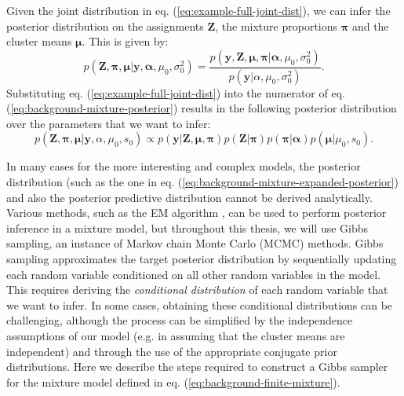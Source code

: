 Given the joint distribution in eq. (\ref{eq:example-full-joint-dist}), we can infer the posterior distribution on the assignments $\boldsymbol{Z}$, the mixture proportions $\boldsymbol{\pi}$ and the cluster means $\boldsymbol{\mu}$. This is given by:
\begin{equation}
p(\boldsymbol{Z},\boldsymbol{\pi},\boldsymbol{\mu} \vert \boldsymbol{y}, \boldsymbol{\alpha},\mu_0,\sigma_0^2) = \frac{p(\boldsymbol{y}, \boldsymbol{Z}, \boldsymbol{\mu},\boldsymbol{\pi} \vert \boldsymbol{\alpha},\mu_0,\sigma_0^2)}{p(\boldsymbol{y} \vert \alpha,\mu_0,\sigma_0^2)}.
\label{eq:background-mixture-posterior}
\end{equation}
Substituting eq. (\ref{eq:example-full-joint-dist}) into the numerator of eq. (\ref{eq:background-mixture-posterior}) results in the following posterior distribution over the parameters that we want to infer:
\begin{equation}
p(\boldsymbol{Z},\boldsymbol{\pi},\boldsymbol{\mu} \vert \boldsymbol{y},\alpha,\mu_0,s_0) \propto p(\boldsymbol{y} \vert \boldsymbol{Z}, \boldsymbol{\mu},\boldsymbol{\pi}) p(\boldsymbol{Z} \vert \boldsymbol{\pi}) p(\boldsymbol{\pi} \vert \boldsymbol{\alpha}) p(\boldsymbol{\mu} \vert \mu_0, s_0).
\label{eq:background-mixture-expanded-posterior}
\end{equation}

In many cases for the more interesting and complex models, the posterior distribution (such as the one in eq. (\ref{eq:background-mixture-expanded-posterior}) and also the posterior predictive distribution cannot be derived analytically. Various methods, such as the EM algorithm \cite{gelman2014bayesian}, can be used to perform posterior inference in a mixture model, but throughout this thesis, we will use Gibbs sampling, an instance of Markov chain Monte Carlo (MCMC) methods. Gibbs sampling approximates the target posterior distribution by sequentially updating each random variable conditioned on all other random variables in the model. This requires deriving the \emph{conditional distribution} of each random variable that we want to infer. In some cases, obtaining these conditional distributions can be challenging, although the process can be simplified by the independence assumptions of our model (e.g. in assuming that the cluster means are independent) and through the use of the appropriate conjugate prior distributions.  Here we describe the steps required to construct a Gibbs sampler for the mixture model defined in eq. (\ref{eq:background-finite-mixture}).

